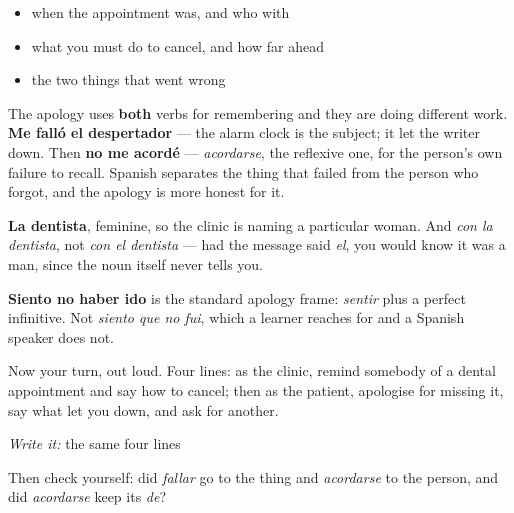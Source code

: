 \begin{itemize}
\raggedright
  \item when the appointment was, and who with
  \item what you must do to cancel, and how far ahead
  \item the two things that went wrong
\end{itemize}

\begin{culture}
The apology uses \textbf{both} verbs for remembering and they are doing different work. \textbf{Me falló el despertador} — the alarm clock is the subject; it let the writer down. Then \textbf{no me acordé} — \emph{acordarse}, the reflexive one, for the person's own failure to recall. Spanish separates the thing that failed from the person who forgot, and the apology is more honest for it.

\textbf{La dentista}, feminine, so the clinic is naming a particular woman. And \emph{con la dentista}, not \emph{con el dentista} — had the message said \emph{el}, you would know it was a man, since the noun itself never tells you.

\textbf{Siento no haber ido} is the standard apology frame: \emph{sentir} plus a perfect infinitive. Not \emph{siento que no fui}, which a learner reaches for and a Spanish speaker does not.
\end{culture}

\begin{tcolorbox}[breakable,colback=teal!4,colframe=teal!35!black,title={Before you move on}]
Now your turn, out loud. Four lines: as the clinic, remind somebody of a dental appointment and say how to cancel; then as the patient, apologise for missing it, say what let you down, and ask for another.

\emph{Write it:} the same four lines

Then check yourself: did \emph{fallar} go to the thing and \emph{acordarse} to the person, and did \emph{acordarse} keep its \emph{de}?
\end{tcolorbox}
